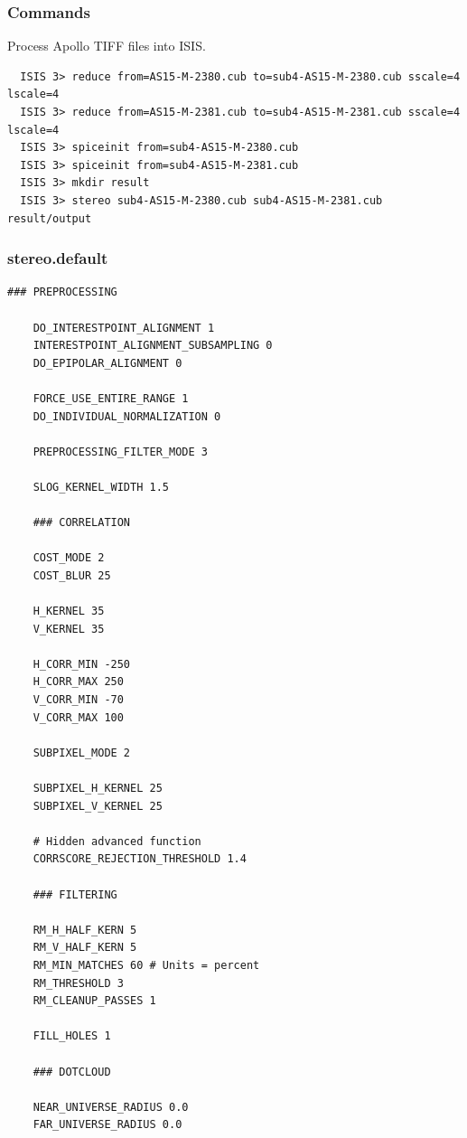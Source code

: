 \subsubsection*{Commands}

Process Apollo TIFF files into \ac{ISIS}.
\begin{verbatim}
  ISIS 3> reduce from=AS15-M-2380.cub to=sub4-AS15-M-2380.cub sscale=4 lscale=4
  ISIS 3> reduce from=AS15-M-2381.cub to=sub4-AS15-M-2381.cub sscale=4 lscale=4
  ISIS 3> spiceinit from=sub4-AS15-M-2380.cub
  ISIS 3> spiceinit from=sub4-AS15-M-2381.cub
  ISIS 3> mkdir result
  ISIS 3> stereo sub4-AS15-M-2380.cub sub4-AS15-M-2381.cub result/output
\end{verbatim}

\subsubsection*{stereo.default}

\begin{center}\begin{minipage}{5.5in}
\begin{Verbatim}[frame=single,fontsize=\small,label=stereo.default for Apollo 15 Metric Camera]
    ### PREPROCESSING

    DO_INTERESTPOINT_ALIGNMENT 1
    INTERESTPOINT_ALIGNMENT_SUBSAMPLING 0
    DO_EPIPOLAR_ALIGNMENT 0

    FORCE_USE_ENTIRE_RANGE 1
    DO_INDIVIDUAL_NORMALIZATION 0

    PREPROCESSING_FILTER_MODE 3

    SLOG_KERNEL_WIDTH 1.5

    ### CORRELATION

    COST_MODE 2
    COST_BLUR 25

    H_KERNEL 35
    V_KERNEL 35

    H_CORR_MIN -250
    H_CORR_MAX 250
    V_CORR_MIN -70
    V_CORR_MAX 100

    SUBPIXEL_MODE 2

    SUBPIXEL_H_KERNEL 25
    SUBPIXEL_V_KERNEL 25

    # Hidden advanced function
    CORRSCORE_REJECTION_THRESHOLD 1.4

    ### FILTERING

    RM_H_HALF_KERN 5
    RM_V_HALF_KERN 5
    RM_MIN_MATCHES 60 # Units = percent
    RM_THRESHOLD 3
    RM_CLEANUP_PASSES 1

    FILL_HOLES 1

    ### DOTCLOUD

    NEAR_UNIVERSE_RADIUS 0.0
    FAR_UNIVERSE_RADIUS 0.0
\end{Verbatim}
\end{minipage}\end{center}

